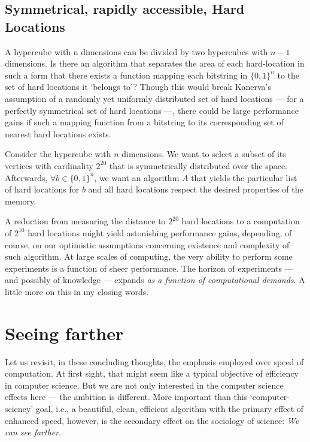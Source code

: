 \subsection{Symmetrical, rapidly accessible, Hard Locations}

A hypercube with n dimensions can be divided by two hypercubes with $n-1$ dimensions. Is there an algorithm that separates the area of each hard-location in such a form that there exists a function mapping each bitstring in $\{0,1\}^n$ to the set of hard locations it `belongs to'?  Though this would break Kanerva's assumption of a randomly yet uniformly distributed set of hard locations --- for a perfectly symmetrical set of hard locations ---, there could be large performance gains if such a mapping function from a bitstring to its corresponding set of nearest hard locations exists.

Consider the hypercube with $n$ dimensions.  We want to select a subset of its vertices with cardinality $2^{20}$ that is symmetrically distributed over the space. Afterwards, $\forall b \in \{ 0,1\} ^n$, we want an algorithm $A$ that yields the particular list of hard locations for $b$ and all hard locations respect the desired properties of the memory.

A reduction from measuring the distance to $2^{20}$ hard locations to a computation of $2^{10}$ hard locations might yield astonishing performance gains, depending, of course, on our optimistic assumptions concerning existence and complexity of such algorithm.  At large scales of computing, the very ability to perform some experiments is a function of sheer performance. The horizon of experiments --- and possibly of knowledge --- expands \emph{as a function of computational demands}. A little more on this in my closing words.

\section{Seeing farther}

Let us revisit, in these concluding thoughts, the emphasis employed over speed of computation.  At first sight, that might seem like a typical objective of efficiency in computer science. But we are not only interested in the computer science effects here --- the ambition is different. More important than this `computer-sciency' goal, i.e., a beautiful, clean, efficient algorithm with the primary effect of enhanced speed, however, is the secondary effect on the sociology of science:  \emph{We can see farther}.

